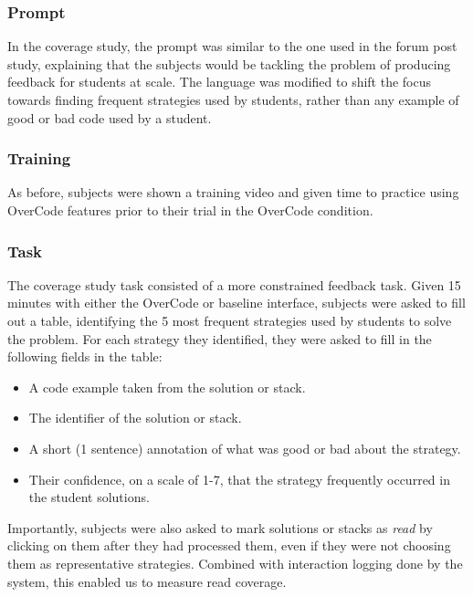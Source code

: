 \subsubsection{Prompt}
In the coverage study, the prompt was similar to the one used in the forum post study, explaining that the subjects would be tackling the problem of producing feedback for students at scale. The language was modified to shift the focus towards finding frequent strategies used by students, rather than any example of good or bad code used by a student.

\subsubsection{Training}
As before, subjects were shown a training video and given time to practice using OverCode features prior to their trial in the OverCode condition.

\subsubsection{Task}
The coverage study task consisted of a more constrained feedback task. Given 15 minutes with either the OverCode or baseline interface, subjects were asked to fill out a table, identifying the 5 most frequent strategies used by students to solve the problem. For each strategy they identified, they were asked to fill in the following fields in the table:
\begin{itemize}
\item A code example taken from the solution or stack.
\item The identifier of the solution or stack.
\item A short (1 sentence) annotation of what was good or bad about the strategy.
\item Their confidence, on a scale of 1-7, that the strategy frequently occurred in the student solutions.
\end{itemize}
Importantly, subjects were also asked to mark solutions or stacks as \emph{read} by clicking on them after they had processed them, even if they were not choosing them as representative strategies. Combined with interaction logging done by the system, this enabled us to measure read coverage.

